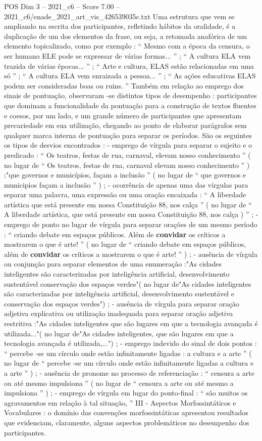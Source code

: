 \begin{textsample}{POS Dim 3 – 2021\_c6 – Score 7.00 – 2021\_c6/enade\_2021\_art\_vis\_426539035c.txt}
Uma estrutura que vem se ampliando na escrita dos participantes, refletindo hábitos da oralidade, é a duplicação de um dos elementos da frase, ou seja, a retomada anafórica de um elemento topicalizado, como por exemplo : “ Mesmo com a época da censura, o ser humano ELE pode se expressar de várias formas... ” ; “ A cultura ELA vem trazida de várias épocas... ” ; “ Arte e cultura, ELAS estão relacionadas em uma só ” ; “ A cultura ELA vem enraizada a pessoa... ” ; “ As ações educativas ELAS podem ser consideradas boas ou ruins. ” Também em relação ao emprego dos sinais de pontuação, observaram -se distintos tipos de desempenho : participantes que dominam a funcionalidade da pontuação para a construção de textos fluentes e coesos, por um lado, e um grande número de participantes que apresentam precariedade em sua utilização, chegando ao ponto de elaborar parágrafos sem qualquer marca interna de pontuação para separar os períodos.
São os seguintes os tipos de desvios encontrados : - emprego de vírgula para separar o sujeito e o predicado : “ Os teatros, festas de rua, carnaval, elevam nosso conhecimento ” ( no lugar de “ Os teatros, festas de rua, carnaval elevam nosso conhecimento ” ) ;"que governos e municípios, façam a inclusão ” ( no lugar de “ que governos e municipios façam a inclusão ” ) ; - ocorrência de apenas uma das vírgulas para separar uma palavra, uma expressão ou uma oração encaixada : “ A liberdade artística que está presente em nossa Constituição 88, nos calça ” ( no lugar de “ A liberdade artística, que está presente em nossa Constituição 88, nos calça ) ” ; - emprego de ponto no lugar de vírgula para separar orações de um mesmo período : “ criando debate em espaços públicos.
Além de \textbf{convidar} os críticos a mostrarem o que é arte! ” ( no lugar de “ criando debate em espaços públicos, além de \textbf{convidar} os críticos a mostrarem o que é arte! ” ) ; - ausência de vírgula ou conjunção para separar elementos de uma enumeração :"As cidades inteligentes são caracterizadas por inteligência artificial, desenvolvimento sustentável conservação dos espaços verdes"( no lugar de"As cidades inteligentes são caracterizadas por inteligência artificial, desenvolvimento sustentável e conservação dos espaços verdes") ; - ausência de vírgula para separar oração adjetiva explicativa ou utilização inadequada para separar oração adjetiva restritiva :"As cidades inteligentes que são lugares em que a tecnologia avançada é utilizada..."( no lugar de"As cidades inteligentes, que são lugares em que a tecnologia avançada é utilizada,...") ; - emprego indevido do sinal de dois pontos : “ percebe -se um círculo onde estão infinitamente ligadas : a cultura e a arte ” ( no lugar de “ percebe -se um círculo onde estão infinitamente ligadas a cultura e a arte ” ) ; - ausência de pronome no processo de referenciação : “ censura a arte ou até mesmo impulsiona ” ( no lugar de “ censura a arte ou até mesmo a impulsiona ” ) ; - emprego de vírgula em lugar do ponto-final : “ são muitos os agravamentos em relação à tal situação, ” III - Aspectos Morfossintáticos e Vocabulares : o domínio das convenções morfossintáticas apresentou resultados que evidenciam, claramente, alguns aspectos problemáticos no desempenho dos participantes.

\end{textsample}
